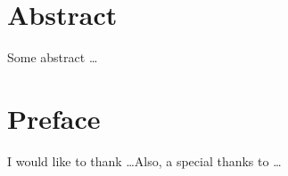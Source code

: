 \thesistitlepage %

\chapter*{Abstract}

Some abstract \ldots

%

\chapter*{Preface}

I would like to thank \ldots Also, a special thanks to \ldots

